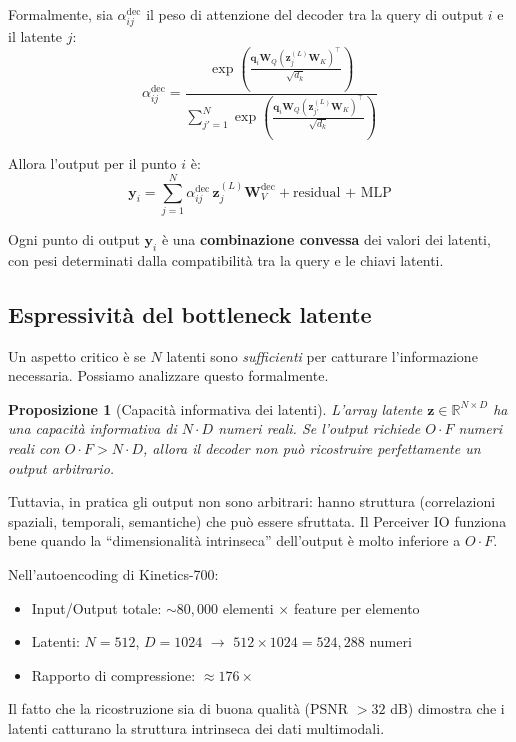 \documentclass[12pt,a4paper]{article}
\newtheorem{proposition}[theorem]{Proposizione}
\begin{document}
Formalmente, sia $\alpha_{ij}^{\text{dec}}$ il peso di attenzione del decoder tra la query di output $i$ e il latente $j$:
\[
\alpha_{ij}^{\text{dec}} = \frac{\exp\!\left(\frac{\mathbf{q}_i \mathbf{W}_Q (\mathbf{z}_j^{(L)} \mathbf{W}_K)^\top}{\sqrt{d_k}}\right)}{\sum_{j'=1}^{N} \exp\!\left(\frac{\mathbf{q}_i \mathbf{W}_Q (\mathbf{z}_{j'}^{(L)} \mathbf{W}_K)^\top}{\sqrt{d_k}}\right)}
\]

Allora l'output per il punto $i$ \`e:
\[
\mathbf{y}_i = \sum_{j=1}^{N} \alpha_{ij}^{\text{dec}} \, \mathbf{z}_j^{(L)} \mathbf{W}_V^{\text{dec}} + \text{residual + MLP}
\]

Ogni punto di output $\mathbf{y}_i$ \`e una \textbf{combinazione convessa} dei valori dei latenti, con pesi determinati dalla compatibilit\`a tra la query e le chiavi latenti.

\subsection{Espressivit\`a del bottleneck latente}

Un aspetto critico \`e se $N$ latenti sono \emph{sufficienti} per catturare l'informazione necessaria. Possiamo analizzare questo formalmente.

\begin{proposition}[Capacit\`a informativa dei latenti]
L'array latente $\mathbf{z} \in \mathbb{R}^{N \times D}$ ha una capacit\`a informativa di $N \cdot D$ numeri reali. Se l'output richiede $O \cdot F$ numeri reali con $O \cdot F > N \cdot D$, allora il decoder \emph{non pu\`o} ricostruire perfettamente un output arbitrario.
\end{proposition}

Tuttavia, in pratica gli output non sono arbitrari: hanno struttura (correlazioni spaziali, temporali, semantiche) che pu\`o essere sfruttata. Il Perceiver IO funziona bene quando la ``dimensionalit\`a intrinseca'' dell'output \`e molto inferiore a $O \cdot F$.

\begin{examplebox}
Nell'autoencoding di Kinetics-700:
\begin{itemize}
    \item Input/Output totale: $\sim 80{,}000$ elementi $\times$ feature per elemento
    \item Latenti: $N = 512$, $D = 1024$ $\to$ $512 \times 1024 = 524{,}288$ numeri
    \item Rapporto di compressione: $\approx 176 \times$
\end{itemize}
Il fatto che la ricostruzione sia di buona qualit\`a (PSNR $> 32$ dB) dimostra che i latenti catturano la struttura intrinseca dei dati multimodali.
\end{examplebox}
\end{document}

